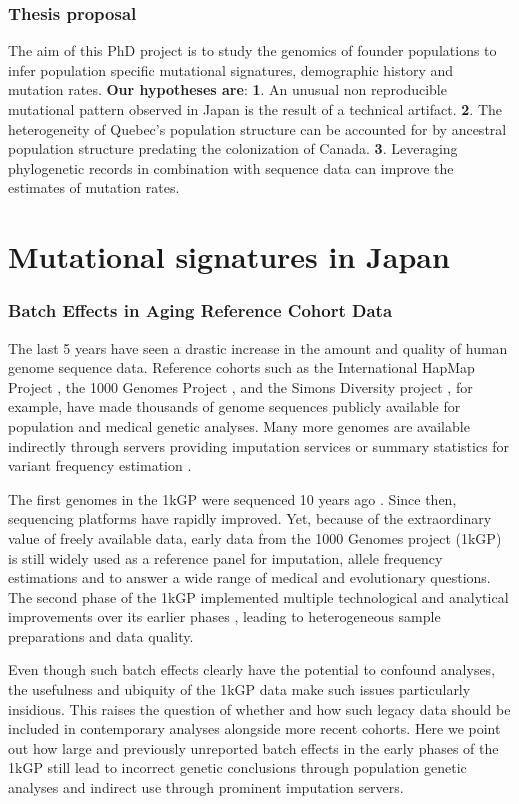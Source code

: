\documentclass[
11pt, %
oneside, %
english, %
doublespacing, %
headsepline, %
chapterinoneline, %
]{MastersDoctoralThesis} %
\begin{document}
\subsection{Thesis proposal}
The aim of this PhD project is to study the genomics of founder populations to infer population specific mutational signatures, demographic history and mutation rates.
\textbf{Our hypotheses are}: \textbf{1}. An unusual non reproducible mutational pattern observed in Japan is the result of a technical artifact.
\textbf{2}. The heterogeneity of Quebec's population structure can be accounted for by ancestral population structure predating the colonization of Canada.
\textbf{3}. Leveraging phylogenetic records in combination with sequence data can improve the estimates of mutation rates.
\vfill
\chapter{Mutational signatures in Japan}

\subsection{Batch Effects in Aging Reference Cohort Data}	
The last 5 years have seen a drastic increase in the amount and quality of human genome sequence data. 
Reference cohorts such as the International HapMap Project \citep{HapMap2005}, the 1000 Genomes Project \citep{1000GenomesProjectConsortium2010,The1000GenomesProjectConsortium2012}, and the Simons Diversity project \citep{Mallick2016}, for example, have made thousands of genome sequences publicly available for population and medical genetic analyses. 
Many more genomes are available indirectly through servers providing imputation services \citep{HapMap2005} or summary statistics for variant frequency estimation \citep{Lek2016}.

The first genomes in the 1kGP were sequenced 10 years ago \citep{VanDijk2014}. 
Since then, sequencing platforms have rapidly improved. 
Yet, because of the extraordinary value of freely available data, early data from the 1000 Genomes project (1kGP) is still widely used as a reference panel for imputation, allele frequency estimations and to answer a wide range of medical and evolutionary questions. 
The second phase of the 1kGP implemented multiple technological and analytical improvements over its earlier phases \citep{The1000GenomesProjectConsortium2012}, leading to heterogeneous sample preparations and data quality.

Even though such batch effects clearly have the potential to confound analyses, the usefulness and ubiquity of the 1kGP data make such issues particularly insidious.   
This raises the question of whether and how such legacy data should be included in contemporary analyses alongside more recent cohorts.
Here we point out how large and previously unreported batch effects in the early phases of the 1kGP still lead to incorrect genetic conclusions through population genetic analyses and indirect use through prominent imputation servers.
\end{document}
